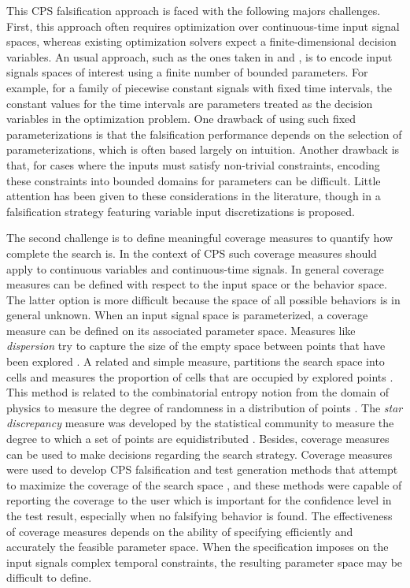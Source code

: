 This CPS falsification approach is faced with the following majors challenges.
First, this approach often
requires optimization over continuous-time input signal spaces, whereas
existing optimization solvers expect a finite-dimensional decision variables. 
An usual approach, such as the ones taken in \cite{BreachCAV10} and 
\cite{Nghiem10}, is to encode input signals spaces of interest using a
finite number of bounded parameters. For example, for a family of
piecewise constant signals with fixed time intervals, the
constant values for the time intervals are parameters treated as the decision variables in the optimization
problem. One drawback of using such fixed parameterizations 
is that the falsification performance depends on the selection of parameterizations, 
which is often based largely on intuition. Another drawback is that, for cases where the
inputs must satisfy non-trivial constraints, encoding these constraints 
into bounded domains for parameters can be difficult. Little attention has
been given to these considerations in the literature, though in 
\cite{DBLP:conf/atva/DeshmukhJKM15} a
falsification strategy featuring variable input discretizations is proposed.

The second challenge is to define meaningful coverage measures to quantify how complete the search is. In the context of CPS such coverage measures should apply to continuous
variables and continuous-time signals. In general coverage measures can be defined with respect to the input space or the behavior space. The latter option is more difficult because the space of all possible behaviors is in general unknown. When an input signal space is parameterized, a coverage measure can be defined on its associated parameter space. Measures like \emph{dispersion} try to capture the size of the empty space between points that have been explored \cite{Esposito04}. A related and simple measure, partitions the search space into cells and measures the proportion of cells that are occupied by explored points \cite{Skruch2011}. This method is related to the combinatorial entropy notion from the domain of physics to measure the degree of randomness in a distribution of points \cite{Gabbay06}. The \emph{star discrepancy} measure was developed by the statistical community 
to measure the degree to which a set of points are equidistributed \cite{Heinrich03}. Besides, coverage measures can be used to make decisions regarding the search strategy. Coverage measures were used to develop CPS falsification and test generation methods that attempt to maximize the coverage of the search space \cite{DangN09,Dreossi2015,CAV2017}, and these methods were capable of reporting the coverage to the user which is important for the confidence level in the test result, especially when no falsifying behavior is found. The effectiveness of coverage measures depends on the ability of specifying efficiently and accurately the feasible parameter space. When the specification imposes on the input signals complex temporal constraints, the resulting parameter space may be difficult to define. 


